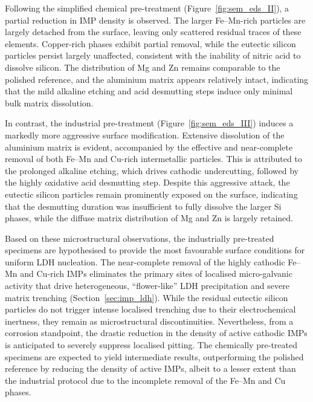 \documentclass[11pt,twoside,a4paper,final]{report}
\begin{document}
Following the simplified chemical pre-treatment (Figure~\ref{fig:sem_eds_II}), a partial reduction in IMP density is observed. The larger Fe--Mn-rich particles are largely detached from the surface, leaving only scattered residual traces of these elements. Copper-rich phases exhibit partial removal, while the eutectic silicon particles persist largely unaffected, consistent with the inability of nitric acid to dissolve silicon. The distribution of Mg and Zn remains comparable to the polished reference, and the aluminium matrix appears relatively intact, indicating that the mild alkaline etching and acid desmutting steps induce only minimal bulk matrix dissolution.

In contrast, the industrial pre-treatment (Figure~\ref{fig:sem_eds_III}) induces a markedly more aggressive surface modification. Extensive dissolution of the aluminium matrix is evident, accompanied by the effective and near-complete removal of both Fe--Mn and Cu-rich intermetallic particles. This is attributed to the prolonged alkaline etching, which drives cathodic undercutting, followed by the highly oxidative acid desmutting step. Despite this aggressive attack, the eutectic silicon particles remain prominently exposed on the surface, indicating that the desmutting duration was insufficient to fully dissolve the larger Si phases, while the diffuse matrix distribution of Mg and Zn is largely retained.

Based on these microstructural observations, the industrially pre-treated specimens are hypothesised to provide the most favourable surface conditions for uniform LDH nucleation. The near-complete removal of the highly cathodic Fe--Mn and Cu-rich IMPs eliminates the primary sites of localised micro-galvanic activity that drive heterogeneous, ``flower-like'' LDH precipitation and severe matrix trenching (Section~\ref{sec:imp_ldh}). While the residual eutectic silicon particles do not trigger intense localised trenching due to their electrochemical inertness, they remain as microstructural discontinuities. Nevertheless, from a corrosion standpoint, the drastic reduction in the density of active cathodic IMPs is anticipated to severely suppress localised pitting. The chemically pre-treated specimens are expected to yield intermediate results, outperforming the polished reference by reducing the density of active IMPs, albeit to a lesser extent than the industrial protocol due to the incomplete removal of the Fe--Mn and Cu phases.

\newpage
\end{document}
